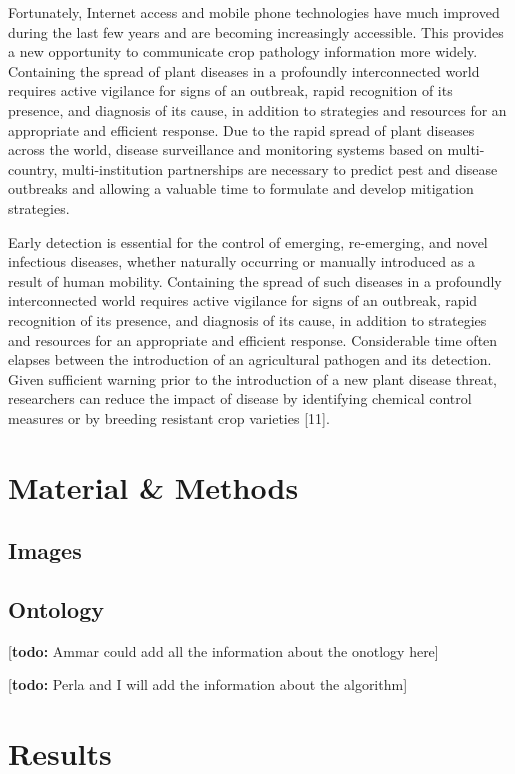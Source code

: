 \documentclass{frontiersSCNS} %
\newcommand{\todo}[1]{
  \rule{0pt}{0pt}\marginpar{{\color{blue}\rule{1ex}{1ex}}}
  {[\textbf{\color{blue}todo:} #1]}}
\begin{document}
Fortunately, Internet access and mobile phone technologies have much improved during the last few years and are becoming increasingly accessible. This provides a new opportunity to communicate crop pathology information more widely. Containing the spread of plant diseases in a profoundly interconnected world requires active vigilance for signs of an outbreak, rapid recognition of its presence, and diagnosis of its cause, in addition to strategies and resources for an appropriate and efficient response. Due to the rapid spread of plant diseases across the world, disease surveillance and monitoring systems based on multi-country, multi-institution partnerships are necessary to predict pest and disease outbreaks and allowing a valuable time to formulate and develop mitigation strategies. 

Early detection is essential for the control of emerging, re-emerging, and novel infectious diseases, whether naturally occurring or manually introduced as a result of human mobility. Containing the spread of such diseases in a profoundly interconnected world requires active vigilance for signs of an outbreak, rapid recognition of its presence, and diagnosis of its cause, in addition to strategies and resources for an appropriate and efficient response. Considerable time often elapses between the introduction of an agricultural pathogen and its detection. Given sufficient warning prior to the introduction of a new plant disease threat, researchers can reduce the impact of disease by identifying chemical control measures or by breeding resistant crop varieties [11].  

\section{Material \& Methods}

\subsection{Images}


\subsection{Ontology}
\todo{Ammar could add all the information about the onotlogy here}

\todo{Perla and I will add the information about the algorithm}

\section{Results}
\end{document}
